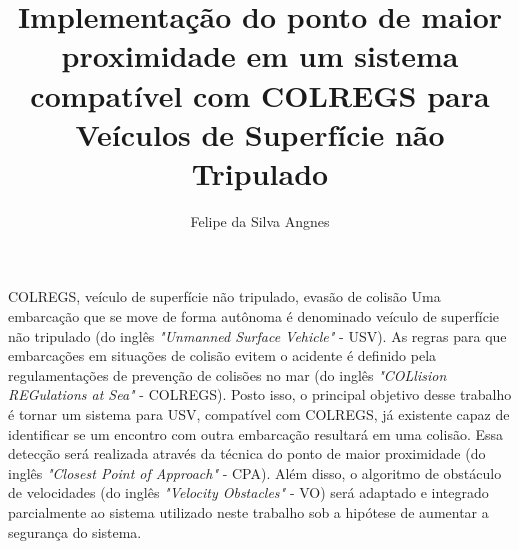 \documentclass[portuguese,oneside]{tcc}
\author{Felipe da Silva Angnes}
\title{Implementação do ponto de maior proximidade em um sistema compatível com COLREGS para Veículos de Superfície não Tripulado}
      {Closest Point of Approach implementation for a COLREGS compliant Unmanned Surface Vehicle system}
\newcommand\frm[2][noinline]{\todo[author=FRM,color=red!75,size=tiny,#1]{{#2}}}
\begin{document}







\begin{resumo}{COLREGS, veículo de superfície não tripulado, evasão de colisão}
	\frm[inline]{Resumo e abstract!}
Uma embarcação que se move de forma autônoma é denominado veículo de superfície não tripulado (do inglês \textit{"Unmanned Surface Vehicle"} - USV). As regras para que embarcações em situações de colisão evitem o acidente é definido pela regulamentações de prevenção de colisões no mar (do inglês \textit{"COLlision REGulations at Sea"} - COLREGS). Posto isso, o principal objetivo desse trabalho é tornar um sistema para USV, compatível com COLREGS, já existente capaz de identificar se um encontro com outra embarcação resultará em uma colisão. Essa detecção será realizada através da técnica do ponto de maior proximidade (do inglês \textit{"Closest Point of Approach"} - CPA). Além disso, o algoritmo de obstáculo de velocidades (do inglês \textit{"Velocity Obstacles"} - VO) será adaptado e integrado parcialmente ao sistema utilizado neste trabalho sob a hipótese de aumentar a segurança do sistema.
\end{resumo}
\end{document}
